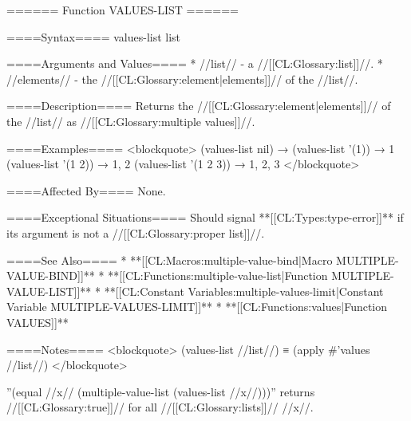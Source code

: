 ====== Function VALUES-LIST ======

====Syntax====
\DefunWithValues values-list {list} {}

====Arguments and Values====
  * //list// - a //[[CL:Glossary:list]]//.
  * //elements// - the //[[CL:Glossary:element|elements]]// of the //list//.

====Description====
Returns the //[[CL:Glossary:element|elements]]// of the //list// as //[[CL:Glossary:multiple values]]//.

====Examples====
<blockquote> (values-list nil) → \novalues (values-list '(1)) → 1 (values-list '(1 2)) → 1, 2 (values-list '(1 2 3)) → 1, 2, 3 </blockquote>

====Affected By====
None.

====Exceptional Situations====
Should signal **[[CL:Types:type-error]]** if its argument is not a //[[CL:Glossary:proper list]]//.

====See Also====
  * **[[CL:Macros:multiple-value-bind|Macro MULTIPLE-VALUE-BIND]]**
  * **[[CL:Functions:multiple-value-list|Function MULTIPLE-VALUE-LIST]]**
  * **[[CL:Constant Variables:multiple-values-limit|Constant Variable MULTIPLE-VALUES-LIMIT]]**
  * **[[CL:Functions:values|Function VALUES]]**

====Notes====
<blockquote> (values-list //list//) ≡ (apply #'values //list//) </blockquote>

''(equal //x// (multiple-value-list (values-list //x//)))'' returns //[[CL:Glossary:true]]// for all //[[CL:Glossary:lists]]// //x//.

